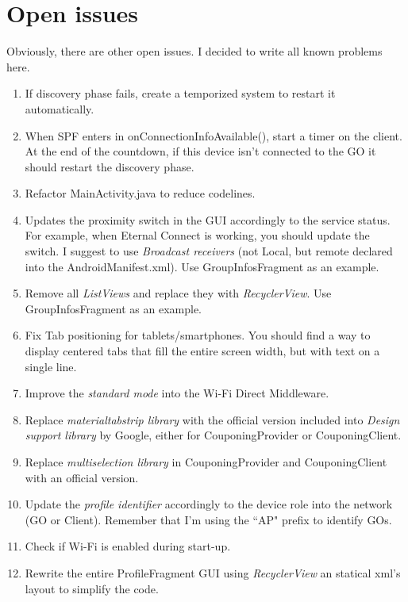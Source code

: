 \section*{Open issues}
Obviously, there are other open issues. I decided to write all known problems here.
\begin{enumerate}
	\item If discovery phase fails, create a temporized system to restart it automatically.
	\item When SPF enters in \textsf{onConnectionInfoAvailable()}, start a timer on the client. At the end of the countdown, if this device isn't connected to the GO it should restart the discovery phase.
	\item Refactor \textsf{MainActivity.java} to reduce codelines.
	\item Updates the proximity switch in the GUI accordingly to the service status. For example, when Eternal Connect is working, you should update the switch. I suggest to use \emph{Broadcast receivers} (not Local, but remote declared into the \textsf{AndroidManifest.xml}). Use \textsf{GroupInfosFragment} as an example.
	\item Remove all \emph{ListViews} and replace they with \emph{RecyclerView}. Use \textsf{GroupInfosFragment} as an example.
	\item Fix Tab positioning for tablets/smartphones. You should find a way to display centered tabs that fill the entire screen width, but with text on a single line.
	\item Improve the \emph{standard mode} into the Wi-Fi Direct Middleware.
	\item Replace \emph{materialtabstrip library} with the official version included into \emph{Design support library} by Google, either for \textsf{CouponingProvider} or \textsf{CouponingClient}.
	\item Replace \emph{multiselection library} in \textsf{CouponingProvider} and \textsf{CouponingClient} with an official version.
	\item Update the \emph{profile identifier} accordingly to the device role into the network (GO or Client). Remember that I'm using the ``AP" prefix to identify GOs.
	\item Check if Wi-Fi is enabled during start-up.
	\item Rewrite the entire \textsf{ProfileFragment} GUI using \emph{RecyclerView} an statical xml's layout to simplify the code.
\end{enumerate}



